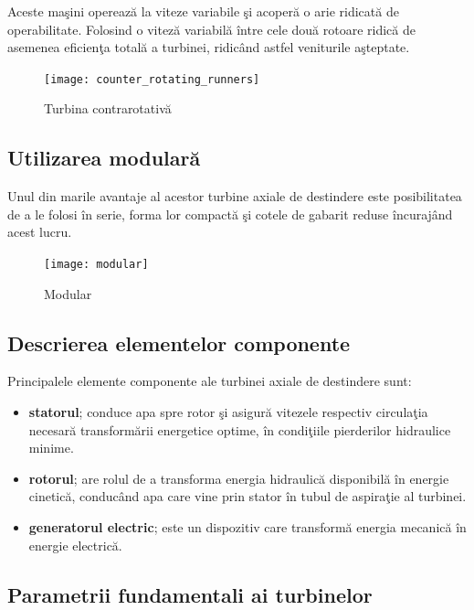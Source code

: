 Aceste ma\c{s}ini opereaz\u{a} la viteze variabile \c{s}i acoper\u{a} o arie ridicat\u{a} de operabilitate. Folosind o vitez\u{a} variabil\u{a} \^{i}ntre cele dou\u{a} rotoare ridic\u{a} de asemenea eficien\c{t}a total\u{a} a turbinei, ridic\^{a}nd astfel veniturile a\c{s}teptate.

\begin{figure}[h!]
	\centering
	\texttt{[image: counter\_rotating\_runners]}
	\caption{Turbina contrarotativ\u{a} \cite{andolfatto2016simulation}}
	\label{Turbina contrarotativ\u{a}}
\end{figure}

\clearpage


\subsection{Utilizarea modular\u{a}}
Unul din marile avantaje al acestor turbine axiale de destindere este posibilitatea de a le folosi \^{i}n serie, forma lor compact\u{a} \c{s}i cotele de gabarit reduse \^{i}ncuraj\^{a}nd acest lucru.

\begin{figure}[h!]
	\centering
	\texttt{[image: modular]}
	\caption{Modular \cite{hasmatuchi2014new}}
	\label{Modular}
\end{figure}

\subsection{Descrierea elementelor componente}

Principalele elemente componente ale turbinei axiale de destindere sunt:

\begin{itemize}
	\item \textbf{statorul}; conduce apa spre rotor \c{s}i asigur\u{a} vitezele respectiv circula\c{t}ia necesar\u{a} transform\u{a}rii energetice optime, \^{i}n condi\c{t}iile pierderilor hidraulice minime.
	\item \textbf{rotorul}; are rolul de a transforma energia hidraulic\u{a} disponibil\u{a} \^{i}n energie cinetic\u{a}, conduc\^{a}nd apa care vine prin stator \^{i}n tubul de aspira\c{t}ie al turbinei.
	\item \textbf{generatorul electric}; este un dispozitiv care transform\u{a} energia mecanic\u{a} \^{i}n energie electric\u{a}.
\end{itemize}


\subsection{Parametrii fundamentali ai turbinelor}

